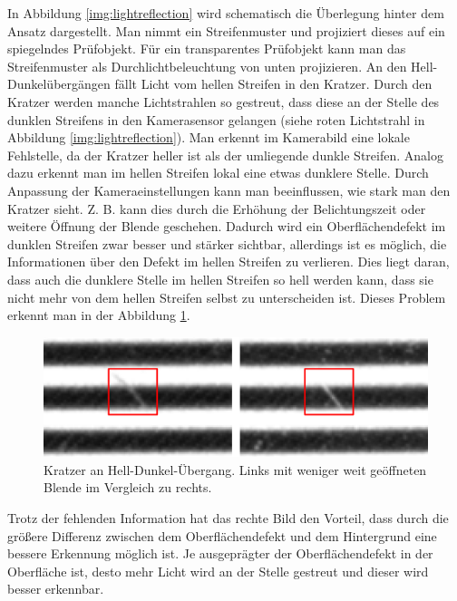 \noindent
In Abbildung \ref{img:lightreflection} wird schematisch die Überlegung hinter dem Ansatz dargestellt.
Man nimmt ein Streifenmuster und projiziert dieses auf ein spiegelndes Prüfobjekt.
Für ein transparentes Prüfobjekt kann man das Streifenmuster als Durchlichtbeleuchtung von unten projizieren.
An den Hell-Dunkelübergängen fällt Licht vom hellen Streifen in den Kratzer.
Durch den Kratzer werden manche Lichtstrahlen so gestreut, dass diese an der Stelle des dunklen Streifens in den Kamerasensor gelangen (siehe roten Lichtstrahl in Abbildung \ref{img:lightreflection}).
Man erkennt im Kamerabild eine lokale Fehlstelle, da der Kratzer heller ist als der umliegende dunkle Streifen.
Analog dazu erkennt man im hellen Streifen lokal eine etwas dunklere Stelle.
Durch Anpassung der Kameraeinstellungen kann man beeinflussen, wie stark man den Kratzer sieht.
Z. B. kann dies durch die Erhöhung der Belichtungszeit oder weitere Öffnung der Blende geschehen.
Dadurch wird ein Oberflächendefekt im dunklen Streifen zwar besser und stärker sichtbar, allerdings ist es möglich, die Informationen über den Defekt im hellen Streifen zu verlieren.
Dies liegt daran, dass auch die dunklere Stelle im hellen Streifen so hell werden kann, dass sie nicht mehr von dem hellen Streifen selbst zu unterscheiden ist.
Dieses Problem erkennt man in der Abbildung \ref{img:scratches}.

\begin{figure}[H]
	\centering
	\includegraphics[width=\textwidth]{03_sichtpruefungDurchLichtstreuung/verfahren/figures/visibleScratch}
	\caption[Kratzer]{Kratzer an Hell-Dunkel-Übergang. Links mit weniger weit geöffneten Blende im Vergleich zu rechts.}
	\label{img:scratches}
\end{figure}

\noindent
Trotz der fehlenden Information hat das rechte Bild den Vorteil, dass durch die größere Differenz zwischen dem Oberflächendefekt und dem Hintergrund eine bessere Erkennung möglich ist.
Je ausgeprägter der Oberflächendefekt in der Oberfläche ist, desto mehr Licht wird an der Stelle gestreut und dieser wird besser erkennbar.

